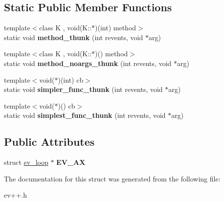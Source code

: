 \subsection*{Static Public Member Functions}
\begin{DoxyCompactItemize}
\item 
\hypertarget{structev_1_1loop__ref_a9e8f3b059640ed2a1c3eef5bd083c999}{}\label{structev_1_1loop__ref_a9e8f3b059640ed2a1c3eef5bd083c999} 
{\footnotesize template$<$class K , void(\+K\+::$\ast$)(int) method$>$ }\\static void {\bfseries method\+\_\+thunk} (int revents, void $\ast$arg)
\item 
\hypertarget{structev_1_1loop__ref_aa0129e98abbdea7d42f18809f1a1a539}{}\label{structev_1_1loop__ref_aa0129e98abbdea7d42f18809f1a1a539} 
{\footnotesize template$<$class K , void(\+K\+::$\ast$)() method$>$ }\\static void {\bfseries method\+\_\+noargs\+\_\+thunk} (int revents, void $\ast$arg)
\item 
\hypertarget{structev_1_1loop__ref_a78f26c622a851958fb753f0387f9c114}{}\label{structev_1_1loop__ref_a78f26c622a851958fb753f0387f9c114} 
{\footnotesize template$<$void($\ast$)(int) cb$>$ }\\static void {\bfseries simpler\+\_\+func\+\_\+thunk} (int revents, void $\ast$arg)
\item 
\hypertarget{structev_1_1loop__ref_a9114fcf7ef168f264abaf05dc7d76c44}{}\label{structev_1_1loop__ref_a9114fcf7ef168f264abaf05dc7d76c44} 
{\footnotesize template$<$void($\ast$)() cb$>$ }\\static void {\bfseries simplest\+\_\+func\+\_\+thunk} (int revents, void $\ast$arg)
\end{DoxyCompactItemize}
\subsection*{Public Attributes}
\begin{DoxyCompactItemize}
\item 
\hypertarget{structev_1_1loop__ref_abbf426c43deec8dad767439421985970}{}\label{structev_1_1loop__ref_abbf426c43deec8dad767439421985970} 
struct \hyperlink{structev__loop}{ev\+\_\+loop} $\ast$ {\bfseries E\+V\+\_\+\+AX}
\end{DoxyCompactItemize}


The documentation for this struct was generated from the following file\+:\begin{DoxyCompactItemize}
\item 
ev++.\+h\end{DoxyCompactItemize}
